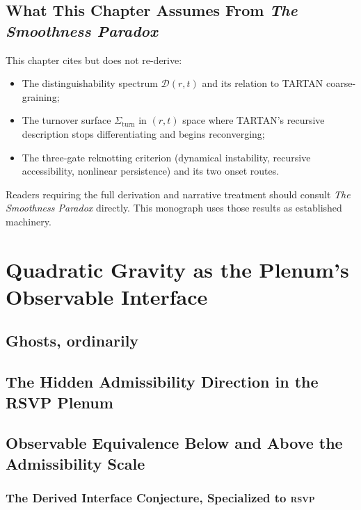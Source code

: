 \documentclass[12pt,a4paper,twoside,openright]{book}
\theoremstyle{plain}
\theoremstyle{definition}
\theoremstyle{remark}
\newcommand{\Dspec}{\mathcal{D}}
\newcommand{\Turn}{\Sigma_{\mathrm{turn}}}
\newcommand{\RSVP}{\textsc{rsvp}}
\begin{document}
\section{What This Chapter Assumes From \emph{The Smoothness Paradox}}

This chapter cites but does not re-derive:
\begin{itemize}
\item The distinguishability spectrum $\Dspec(r, t)$ and its relation to TARTAN coarse-graining;
\item The turnover surface $\Turn$ in $(r, t)$ space where TARTAN's recursive description stops differentiating and begins reconverging;
\item The three-gate reknotting criterion (dynamical instability, recursive accessibility, nonlinear persistence) and its two onset routes.
\end{itemize}

Readers requiring the full derivation and narrative treatment should consult \emph{The Smoothness Paradox} directly. This monograph uses those results as established machinery.


\chapter{Quadratic Gravity as the Plenum's Observable Interface}
\label{ch:quadratic-gravity-interface}


\section{Ghosts, ordinarily}

\section{The Hidden Admissibility Direction in the RSVP Plenum}

\section{Observable Equivalence Below and Above the Admissibility Scale}

\subsection{The Derived Interface Conjecture, Specialized to \RSVP}
\end{document}
